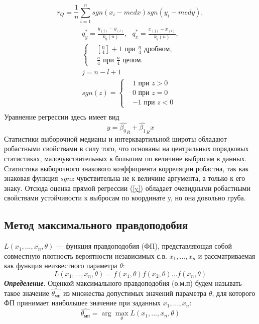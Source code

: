 \begin{equation}
	r_{Q} = \frac{1}{n}\sum_{i=1}^{n}{sgn(x_{i} - med x)sgn(y_{i} - med y)},
	\label{r_Q}
\end{equation}
\begin{multline}
	\\
	q^{*}_{y} = \frac{y_{(j)} -y_{(l)}}{k_{q}(n)},~~~
	q^{*}_{x} = \frac{x_{(j)} - x_{(l)}}{k_{q}(n)}, \\ 
	\begin{cases}
		& [\frac{n}{4}] + 1 \text{ при } \frac{n}{4} \text{ дробном, } \\ 
		& \frac{n}{4} \text{ при } \frac{n}{4} \text{ целом. }
	\end{cases}\\
	j = n - l + 1\\
	sgn(z) = \begin{cases}
		& 1 \text{ при } z > 0 \\ 
		& 0 \text{ при } z = 0 \\
		& -1 \text{ при } z < 0
	\end{cases}\\
	\label{q*}        
\end{multline}
Уравнение регрессии здесь имеет вид 
\begin{equation}
	y = \hat{\beta_{0}}_{R} +  \hat{\beta_{1}}_{R}x
	\label{y}
\end{equation}
Статистики выборочной медианы и интерквартильной широты обладают робастными свойствами в силу того, что основаны на центральных порядковых статистиках, малочувствительных к большим по величине выбросам в данных. Статистика выборочного знакового коэффициента корреляции робастна, так как знаковая функция $sgn z$ чувствительна не к величине аргумента, а только к его знаку. Отсюда оценка прямой регрессии (\ref{y}) обладает очевидными робастными свойствами устойчивости к выбросам по координате y, но она довольно груба.

\subsection{Метод максимального правдоподобия}
\noindent $L(x_{1},... ,x_{n}, \theta)$ — функция правдоподобия (ФП), представляющая собой совместную плотность вероятности независимых с.в. $x_{1}, ... ,x_{n}$ и рассматриваемая как функция неизвестного параметра $\theta$:
\begin{equation}
	L(x_{1},...,x_{n},\theta) = f(x_{1},\theta)f(x_{2},\theta)...f(x_{n}, \theta)
	\label{L()}
\end{equation}
\textbf{\textit{Определение}}. Оценкой максимального правдоподобия (о.м.п) будем называть такое значение $\hat{\theta_{мп}}$ из множества допустимых значений параметра $\theta$, для которого ФП принимает наибольшее значение при заданных $x_{1},...,x_{n}$:
\begin{equation}
	\hat{\theta_{мп}} = \arg \max_{\theta}L(x_{1},...,x_{n},\theta)
	\label{theta_mp}
\end{equation}

